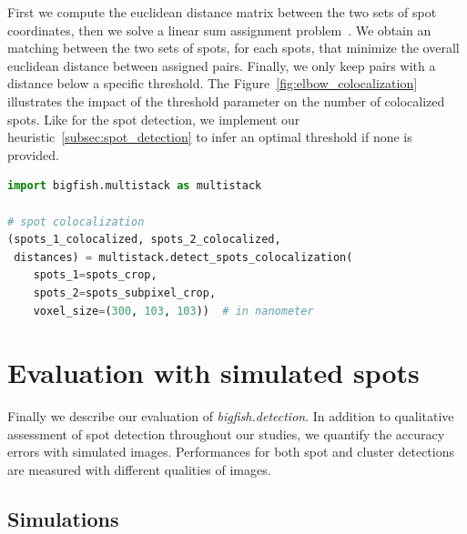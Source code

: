 First we compute the euclidean distance matrix between the two sets of spot coordinates, then we solve a linear sum assignment problem~\cite{crouse_linear_assignment_2016, 2020SciPy-NMeth}.
We obtain an matching between the two sets of spots, for each spots, that minimize the overall euclidean distance between assigned pairs.
Finally, we only keep pairs with a distance below a specific threshold.
The Figure~\ref{fig:elbow_colocalization} illustrates the impact of the threshold parameter on the number of colocalized spots.
Like for the spot detection, we implement our heuristic~\ref{subsec:spot_detection} to infer an optimal threshold if none is provided.\\

\begin{minipage}{0.9\textwidth}
\begin{lstlisting}[language=Python]
import bigfish.multistack as multistack

# spot colocalization
(spots_1_colocalized, spots_2_colocalized,
 distances) = multistack.detect_spots_colocalization(
	spots_1=spots_crop,
	spots_2=spots_subpixel_crop,
	voxel_size=(300, 103, 103))  # in nanometer
\end{lstlisting}
\end{minipage}


\section{Evaluation with simulated spots}
\label{sec:detection_evaluation}

Finally we describe our evaluation of \emph{bigfish.detection}.
In addition to qualitative assessment of spot detection throughout our studies, we quantify the accuracy errors with simulated images.
Performances for both spot and cluster detections are measured with different qualities of images.

\subsection{Simulations}
\label{subsec:simulation}


